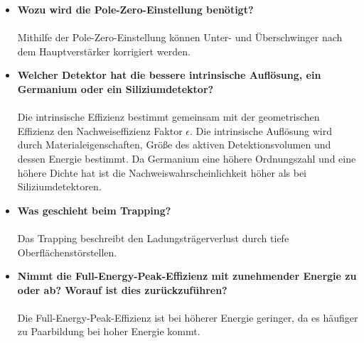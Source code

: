 \documentclass{article}
\begin{document}
\begin{itemize}
	\item \textbf{Wozu wird die Pole-Zero-Einstellung benötigt?}\\\\
	Mithilfe der Pole-Zero-Einstellung können Unter- und Überschwinger nach dem Hauptverstärker korrigiert werden.
	\item \textbf{Welcher Detektor hat die bessere intrinsische Auflösung, ein Germanium oder ein Siliziumdetektor?}\\\\
	Die intrinsische Effizienz bestimmt gemeinsam mit der geometrischen Effizienz den Nachweiseffizienz Faktor $\epsilon$. Die intrinsische Auflösung wird durch Materialeigenschaften, Größe des aktiven Detektionsvolumen und dessen Energie bestimmt. Da Germanium eine höhere Ordnungszahl und eine höhere Dichte hat ist die Nachweiswahrscheinlichkeit höher als bei Siliziumdetektoren.
	\item \textbf{Was geschieht beim Trapping?}\\\\
	Das Trapping beschreibt den Ladungsträgerverlust durch tiefe Oberflächenstörstellen.
	\item \textbf{Nimmt die Full-Energy-Peak-Effizienz mit zunehmender Energie zu oder ab? Worauf ist dies zurückzuführen?}\\\\
	Die Full-Energy-Peak-Effizienz ist bei höherer Energie geringer, da es häufiger zu Paarbildung bei hoher Energie kommt.
	
	\end{itemize}
\end{document}
